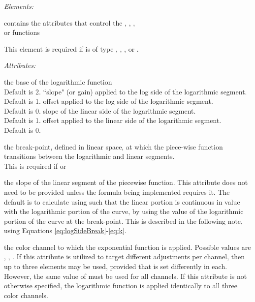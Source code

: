 \emph{Elements:}
\begin{xmlfields}
	 contains the attributes that control the , , , \\or {} functions \par
	
	This element is required if  is of type , , , or .

    \emph{Attributes:}	
    \begin{xmlfields}
    	\xmlitem["base"][optional] the base of the logarithmic function \\Default is 2.
    	\xmlitem["logSideSlope"][optional] ``slope" (or gain) applied to the log side of the logarithmic segment. \\Default is 1.
    	\xmlitem["logSideOffset"][optional] offset applied to the log side of the logarithmic segment. \\Default is 0.
    	\xmlitem["linSideSlope"][optional] slope of the linear side of the logarithmic segment. \\Default is 1.
    	\xmlitem["linSideOffset"][optional] offset applied to the linear side of the logarithmic segment. \\Default is 0.

    	\xmlitem["linSideBreak"][optional] the break-point, defined in linear space, at which the piece-wise function transitions between the logarithmic and linear segments. \\This is required if  or 
    	
    	\xmlitem["linearSlope"][optional] the slope of the linear segment of the piecewise function. This attribute does not need to be provided unless the formula being implemented requires it. The default is to calculate using  such that the linear portion is continuous in value with the logarithmic portion of the curve, by using the value of the logarithmic portion of the curve at the break-point. This is described in the following note, using Equations \ref{eq:logSideBreak}-\ref{eq:k}.
    	
		\xmlitem["channel"][optional] the color channel to which the exponential function is applied. Possible values are , , .
        If this attribute is utilized to target different adjustments per channel, then up to three  elements may be used, provided that  is set differently in each. However, the same value of  must be used for all channels. If this attribute is not otherwise specified, the logarithmic function is applied identically to all three color channels.  	
    \end{xmlfields}

\end{xmlfields}

